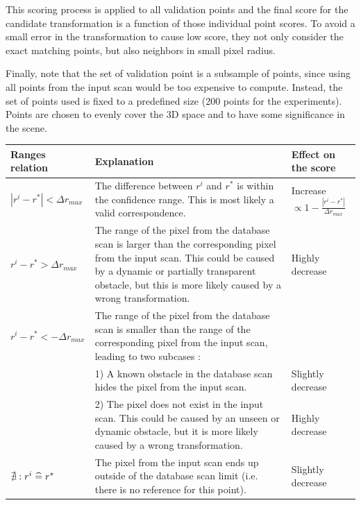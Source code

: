 This scoring process is applied to all validation points and the final score for the candidate transformation is a function of those individual point scores. To avoid a small error in the transformation to cause low score, they not only consider the exact matching points, but also neighbors in small pixel radius.

Finally, note that the set of validation point is a subsample of points, since using all points from the input scan would be too expensive to compute. Instead, the set of points used is fixed to a predefined size (200 points for the experiments). Points are chosen to evenly cover the 3D space and to have some significance in the scene. 

\begin{table}[H]
    \centering
    \begin{tabular}{@{}p{}p{}p{}@{}}
        \toprule %
        \textbf{Ranges relation}         & \textbf{Explanation}                                                                                                    & \textbf{Effect on the score} \\
        \hline
        $|r^i - r^*| < \Delta r_{max}$   & The difference between $r^i$ and $r^*$ is within the confidence range. This is most likely a valid correspondence.      & Increase $\propto 1-\frac{|r^i-r^*|}{\Delta r_{max}}$ \\
        $r^i - r^* > \Delta r_{max}$     & The range of the pixel from the database scan is larger than the corresponding pixel from the input scan. This could be caused by a dynamic or partially transparent obstacle, but this is more likely caused by a wrong transformation. & Highly decrease \\
        $r^i - r^* < -\Delta r_{max}$    & The range of the pixel from the database scan is smaller than the range of the corresponding pixel from the input scan, leading to two subcases : & \\
                                         & 1) A known obstacle in the database scan hides the pixel from the input scan.                                           & Slightly decrease \\
                                         & 2) The pixel does not exist in the input scan. This could be caused by an unseen or dynamic obstacle, but it is more likely caused by a wrong transformation.       & Highly decrease \\
        $\nexists : r^i \mathrel{\widehat{=}} r^*$ & The pixel from the input scan ends up outside of the database scan limit (i.e. there is no reference for this point).   & Slightly decrease \\

\end{tabular}
\end{table}
